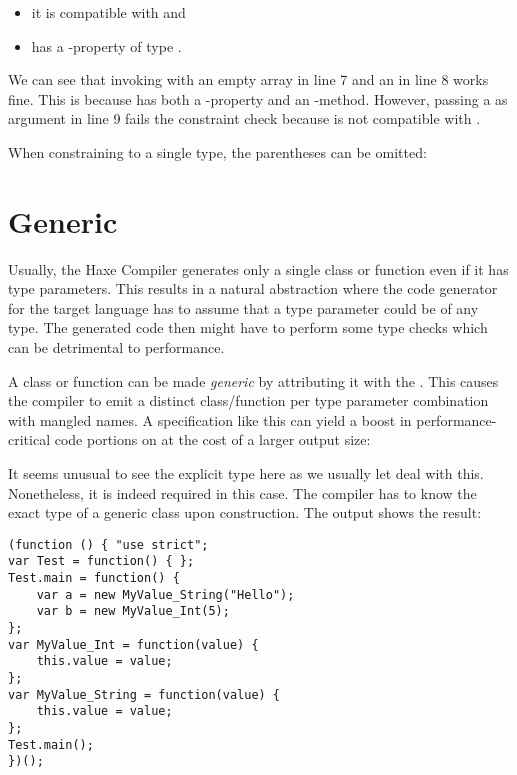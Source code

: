 \begin{itemize}
	\item it is compatible with  and
	\item has a -property of type .
\end{itemize}
We can see that invoking  with an empty array in line 7 and an  in line 8 works fine. This is because  has both a -property and an -method. However, passing a  as argument in line 9 fails the constraint check because  is not compatible with . 

When constraining to a single type, the parentheses can be omitted:



\section{Generic}
\label{type-system-generic}

Usually, the Haxe Compiler generates only a single class or function even if it has type parameters. This results in a natural abstraction where the code generator for the target language has to assume that a type parameter could be of any type. The generated code then might have to perform some type checks which can be detrimental to performance.

A class or function can be made \emph{generic} by attributing it with the  . This causes the compiler to emit a distinct class/function per type parameter combination with mangled names. A specification like this can yield a boost in performance-critical code portions on  at the cost of a larger output size:


It seems unusual to see the explicit type  here as we usually let  deal with this. Nonetheless, it is indeed required in this case. The compiler has to know the exact type of a generic class upon construction. The  output shows the result:

\begin{lstlisting}
(function () { "use strict";
var Test = function() { };
Test.main = function() {
	var a = new MyValue_String("Hello");
	var b = new MyValue_Int(5);
};
var MyValue_Int = function(value) {
	this.value = value;
};
var MyValue_String = function(value) {
	this.value = value;
};
Test.main();
})();
\end{lstlisting}

